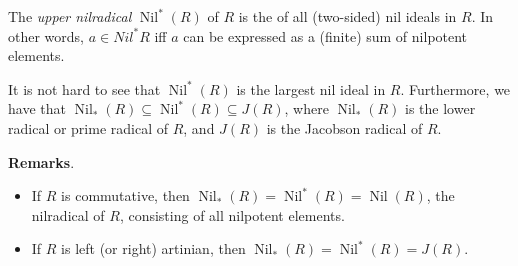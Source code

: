 \documentclass[12pt]{article}
\begin{document}
The \emph{upper nilradical} $\operatorname{Nil}^*(R)$ of $R$ is the  of all (two-sided) nil ideals in $R$.  In other words, $a\in Nil^* R$ iff $a$ can be expressed as a (finite) sum of nilpotent elements.

It is not hard to see that $\operatorname{Nil}^*(R)$ is the largest nil ideal in $R$.  Furthermore, we have that  $\operatorname{Nil}_*(R)\subseteq \operatorname{Nil}^*(R)\subseteq J(R)$, where $\operatorname{Nil}_*(R)$ is the lower radical or prime radical of $R$, and $J(R)$ is the Jacobson radical of $R$.

\textbf{Remarks}.  
\begin{itemize}
\item
If $R$ is commutative, then $\operatorname{Nil}_*(R)=\operatorname{Nil}^*(R)=\operatorname{Nil}(R)$, the nilradical of $R$, consisting of all nilpotent elements.
\item
If $R$ is left (or right) artinian, then $\operatorname{Nil}_*(R)=\operatorname{Nil}^*(R)=J(R)$.
\end{itemize}
\end{document}
